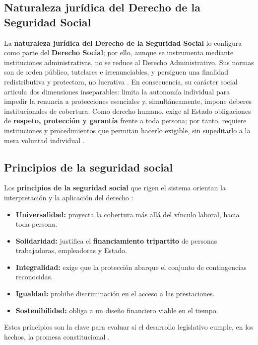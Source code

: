 \documentclass[12pt,letterpaper,oneside]{article}
\begin{document}
\subsection{Naturaleza jur\'idica del Derecho de la Seguridad Social}
La \textbf{naturaleza jur\'idica del Derecho de la Seguridad Social} lo configura como parte del \textbf{Derecho Social}; por ello, aunque se instrumenta mediante instituciones administrativas, no se reduce al Derecho Administrativo. Sus normas son de orden p\'ublico, tutelares e irrenunciables, y persiguen una finalidad redistributiva y protectora, no lucrativa \citep{bricenoRuiz2011,belmontLugoParra2017}. En consecuencia, su car\'acter social articula dos dimensiones inseparables: limita la autonom\'ia individual para impedir la renuncia a protecciones esenciales y, simult\'aneamente, impone deberes institucionales de cobertura. Como derecho humano, exige al Estado obligaciones de \textbf{respeto, protecci\'on y garant\'ia} frente a toda persona; por tanto, requiere instituciones y procedimientos que permitan hacerlo exigible, sin supeditarlo a la mera voluntad individual \citep{acnudhSeguridadSocial2026,ibarraOlguin2022}.

\subsection{Principios de la seguridad social}
Los \textbf{principios de la seguridad social} que rigen el sistema orientan la interpretaci\'on y la aplicaci\'on del derecho \citep{ibarraOlguin2022,hernandezInclusion2020}:
\begin{itemize}[leftmargin=1.4em,itemsep=0.2em]
  \item \textbf{Universalidad:} proyecta la cobertura m\'as all\'a del v\'inculo laboral, hacia toda persona.
  \item \textbf{Solidaridad:} justifica el \textbf{financiamiento tripartito} de personas trabajadoras, empleadoras y Estado.
  \item \textbf{Integralidad:} exige que la protecci\'on abarque el conjunto de contingencias reconocidas.
  \item \textbf{Igualdad:} prohibe discriminaci\'on en el acceso a las prestaciones.
  \item \textbf{Sostenibilidad:} obliga a un dise\~no financiero viable en el tiempo.
\end{itemize}
Estos principios son la clave para evaluar si el desarrollo legislativo cumple, en los hechos, la promesa constitucional \citep{bricenoRuiz2011,moralesFajardo2021}.
\end{document}
